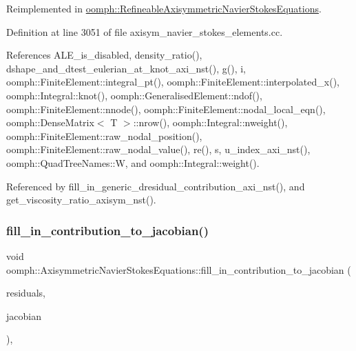 Reimplemented in \hyperlink{classoomph_1_1RefineableAxisymmetricNavierStokesEquations_aceeb8beea173139f943043d2dd47bb19}{oomph\+::\+Refineable\+Axisymmetric\+Navier\+Stokes\+Equations}.



Definition at line 3051 of file axisym\+\_\+navier\+\_\+stokes\+\_\+elements.\+cc.



References A\+L\+E\+\_\+is\+\_\+disabled, density\+\_\+ratio(), dshape\+\_\+and\+\_\+dtest\+\_\+eulerian\+\_\+at\+\_\+knot\+\_\+axi\+\_\+nst(), g(), i, oomph\+::\+Finite\+Element\+::integral\+\_\+pt(), oomph\+::\+Finite\+Element\+::interpolated\+\_\+x(), oomph\+::\+Integral\+::knot(), oomph\+::\+Generalised\+Element\+::ndof(), oomph\+::\+Finite\+Element\+::nnode(), oomph\+::\+Finite\+Element\+::nodal\+\_\+local\+\_\+eqn(), oomph\+::\+Dense\+Matrix$<$ T $>$\+::nrow(), oomph\+::\+Integral\+::nweight(), oomph\+::\+Finite\+Element\+::raw\+\_\+nodal\+\_\+position(), oomph\+::\+Finite\+Element\+::raw\+\_\+nodal\+\_\+value(), re(), s, u\+\_\+index\+\_\+axi\+\_\+nst(), oomph\+::\+Quad\+Tree\+Names\+::W, and oomph\+::\+Integral\+::weight().



Referenced by fill\+\_\+in\+\_\+generic\+\_\+dresidual\+\_\+contribution\+\_\+axi\+\_\+nst(), and get\+\_\+viscosity\+\_\+ratio\+\_\+axisym\+\_\+nst().

\mbox{\label{classoomph_1_1AxisymmetricNavierStokesEquations_a59e4868055f70d2d230f1642ffa0be11}} 
\subsubsection{\texorpdfstring{fill\+\_\+in\+\_\+contribution\+\_\+to\+\_\+jacobian()}{fill\_in\_contribution\_to\_jacobian()}}
{\footnotesize\ttfamily void oomph\+::\+Axisymmetric\+Navier\+Stokes\+Equations\+::fill\+\_\+in\+\_\+contribution\+\_\+to\+\_\+jacobian (\begin{DoxyParamCaption}\item[{\hyperlink{classoomph_1_1Vector}{Vector}$<$ double $>$ \&}]{residuals,  }\item[{\hyperlink{classoomph_1_1DenseMatrix}{Dense\+Matrix}$<$ double $>$ \&}]{jacobian }\end{DoxyParamCaption})\hspace{0.3cm}{\ttfamily [inline]}, {\ttfamily [virtual]}}



